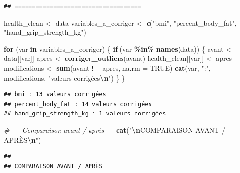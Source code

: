 \documentclass[
]{article}
\newenvironment{Shaded}{\begin{snugshade}}{\end{snugshade}}
\newcommand{\AttributeTok}[1]{\textcolor[rgb]{0.13,0.29,0.53}{#1}}
\newcommand{\CommentTok}[1]{\textcolor[rgb]{0.56,0.35,0.01}{\textit{#1}}}
\newcommand{\ConstantTok}[1]{\textcolor[rgb]{0.56,0.35,0.01}{#1}}
\newcommand{\ControlFlowTok}[1]{\textcolor[rgb]{0.13,0.29,0.53}{\textbf{#1}}}
\newcommand{\FunctionTok}[1]{\textcolor[rgb]{0.13,0.29,0.53}{\textbf{#1}}}
\newcommand{\NormalTok}[1]{#1}
\newcommand{\OtherTok}[1]{\textcolor[rgb]{0.56,0.35,0.01}{#1}}
\newcommand{\SpecialCharTok}[1]{\textcolor[rgb]{0.81,0.36,0.00}{\textbf{#1}}}
\newcommand{\StringTok}[1]{\textcolor[rgb]{0.31,0.60,0.02}{#1}}
\begin{document}
\begin{verbatim}
## ====================================
\end{verbatim}

\begin{Shaded}
\begin{Highlighting}[]
\NormalTok{health\_clean }\OtherTok{\textless{}{-}}\NormalTok{ data}
\NormalTok{variables\_a\_corriger }\OtherTok{\textless{}{-}} \FunctionTok{c}\NormalTok{(}\StringTok{"bmi"}\NormalTok{, }\StringTok{"percent\_body\_fat"}\NormalTok{, }\StringTok{"hand\_grip\_strength\_kg"}\NormalTok{)}

\ControlFlowTok{for}\NormalTok{ (var }\ControlFlowTok{in}\NormalTok{ variables\_a\_corriger) \{}
  \ControlFlowTok{if}\NormalTok{ (var }\SpecialCharTok{\%in\%} \FunctionTok{names}\NormalTok{(data)) \{}
\NormalTok{    avant }\OtherTok{\textless{}{-}}\NormalTok{ data[[var]]}
\NormalTok{    apres }\OtherTok{\textless{}{-}} \FunctionTok{corriger\_outliers}\NormalTok{(avant)}
\NormalTok{    health\_clean[[var]] }\OtherTok{\textless{}{-}}\NormalTok{ apres}
\NormalTok{    modifications }\OtherTok{\textless{}{-}} \FunctionTok{sum}\NormalTok{(avant }\SpecialCharTok{!=}\NormalTok{ apres, }\AttributeTok{na.rm =} \ConstantTok{TRUE}\NormalTok{)}
    \FunctionTok{cat}\NormalTok{(var, }\StringTok{":"}\NormalTok{, modifications, }\StringTok{"valeurs corrigées}\SpecialCharTok{\textbackslash{}n}\StringTok{"}\NormalTok{)}
\NormalTok{  \}}
\NormalTok{\}}
\end{Highlighting}
\end{Shaded}

\begin{verbatim}
## bmi : 13 valeurs corrigées
## percent_body_fat : 14 valeurs corrigées
## hand_grip_strength_kg : 1 valeurs corrigées
\end{verbatim}

\begin{Shaded}
\begin{Highlighting}[]
\CommentTok{\# {-}{-}{-} Comparaison avant / après {-}{-}{-}}
\FunctionTok{cat}\NormalTok{(}\StringTok{"}\SpecialCharTok{\textbackslash{}n}\StringTok{COMPARAISON AVANT / APRÈS}\SpecialCharTok{\textbackslash{}n}\StringTok{"}\NormalTok{)}
\end{Highlighting}
\end{Shaded}

\begin{verbatim}
## 
## COMPARAISON AVANT / APRÈS
\end{verbatim}
\end{document}
